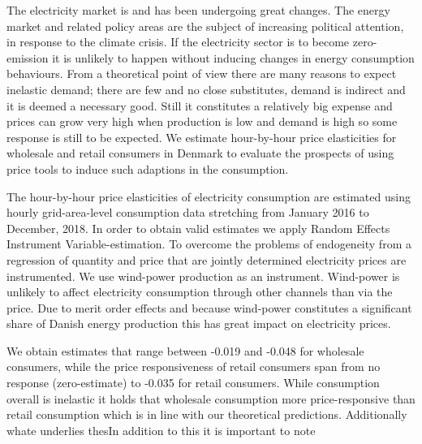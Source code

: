 \label{sec:conclusion}
\begin{comment}
1. Introduktion -> hvorfor spændende; ændret marked 
(2. Tidligere studier -> kobles i stedet for unde resultater) 
3. Teori -> Udbud og efterspørgselskarakteristika 
4. Data ? 
5. Estimation
6. Resultater og diskussion: Måske i kombination med andre initiativer, højere grad af eksponering til de faktiske priser, men stadig meget, der kan undersøges endnu 
\end{comment}
The electricity market is and has been undergoing great changes. The energy market and related policy areas are the subject of increasing political attention, in response to the climate crisis. If the electricity sector is to become zero-emission it is unlikely to happen without inducing changes in energy consumption behaviours. From a theoretical point of view there are many reasons to expect inelastic demand; there are few and no close substitutes, demand is indirect and it is deemed a necessary good. Still it constitutes a relatively big expense and prices can grow very high when production is low and demand is high so some response is still to be expected. We estimate hour-by-hour price elasticities for wholesale and retail consumers in Denmark to evaluate the prospects of using price tools to induce such adaptions in the consumption. 
\bigskip

The hour-by-hour price elasticities of electricity consumption are estimated using hourly grid-area-level consumption data stretching from January 2016 to December, 2018. In order to obtain valid estimates we apply Random Effects Instrument Variable-estimation. To overcome the problems of endogeneity from a regression of quantity and price that are jointly determined electricity prices are instrumented. We use wind-power production as an instrument. Wind-power is unlikely to affect electricity consumption through other channels than via the price. Due to merit order effects and because wind-power constitutes a significant share of Danish energy production this has great impact on electricity prices. 
\bigskip 

We obtain estimates that range between -0.019 and -0.048 for wholesale consumers, while the price responsiveness of retail consumers span from no response (zero-estimate) to -0.035 for retail consumers.  While consumption overall is inelastic it holds that wholesale consumption more price-responsive than retail consumption which is in line with our theoretical predictions. Additionally whate underlies thesIn addition to this it is important to note 


